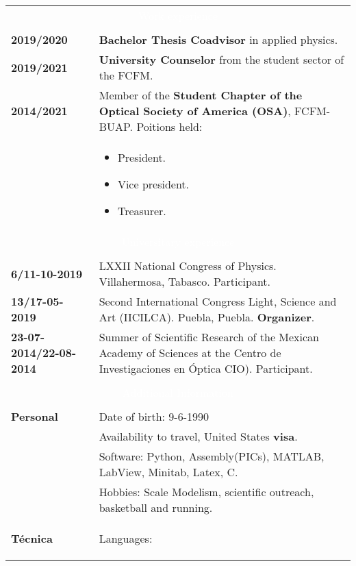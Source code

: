\documentclass[twoside,letter,openright,10pt]{report}
\begin{document}
\begin{table}[hbt!]
\begin{tabular}{p{40mm}p{140mm}}
\multicolumn{2}{c}{\cellcolor{black} \textcolor{white}{Work experience}}
\\
\\
\textbf{2019/2020} & \textbf{Bachelor Thesis Coadvisor} in applied physics.
\\
\textbf{2019/2021} & \textbf{University Counselor} from the student sector of the FCFM.
\\
\textbf{2014/2021} & Member of the  \textbf{Student Chapter of the Optical Society of America (OSA)}, FCFM-BUAP. Poitions held:\\
& \vspace{-2mm} \begin{itemize}[noitemsep,nolistsep]
\item President.
\item Vice president.
\item Treasurer.
\vspace{-4mm}
\end{itemize}
\\
\multicolumn{2}{c}{\cellcolor{black} \textcolor{white}{Universitary experience}}
\\
\\
\textbf{6/11-10-2019} &LXXII National Congress of Physics. Villahermosa, Tabasco. Participant.
\\
\textbf{13/17-05-2019} &Second International Congress Light, Science and Art (IICILCA). Puebla, Puebla. \textbf{Organizer}.
\\
\textbf{23-07-2014/22-08-2014} & Summer of Scientific Research of the Mexican Academy of Sciences at the Centro de Investigaciones en Óptica CIO). Participant.
\\
\\
\multicolumn{2}{c}{\cellcolor{black} \textcolor{white}{ Additional Information}}
\\
\\
\textbf{Personal} &  Date of birth: 9-6-1990
\\
& Availability to travel, United States \textbf{visa}.
\\
& Software: Python, Assembly(PICs), MATLAB, LabView, Minitab, Latex, C.
\\
& Hobbies: Scale Modelism, scientific outreach, basketball and running.
\\
\textbf{Técnica}
& Languages:
\begin{itemize}

\end{itemize}
\end{tabular}
\end{table}
\end{document}
